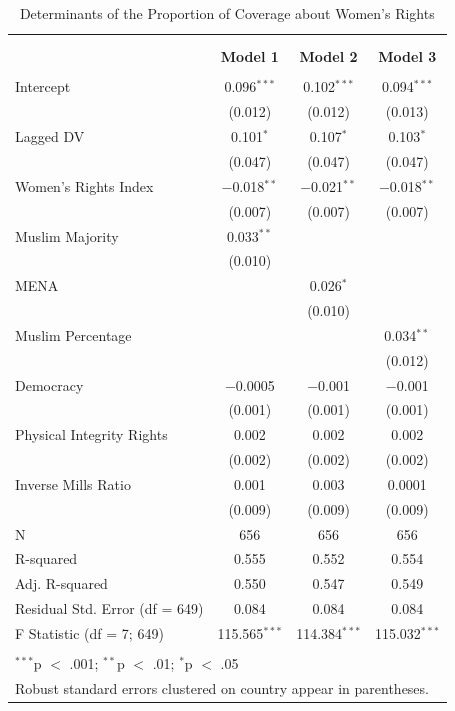 \documentclass[11pt, oneside]{article}
\begin{document}
\begin{table}[!htbp] \centering 
  \caption{Determinants of the Proportion of Coverage about Women's Rights} 
  \label{} 
\begin{tabular}{@{\extracolsep{5pt}}lccc} 
\\[-1.8ex]\hline \\[-1.8ex] 
\\[-1.8ex] & \textbf{Model 1} & \textbf{Model 2} & \textbf{Model 3}\\ 
\hline \\[-1.8ex] 
 Intercept & 0.096$^{***}$ & 0.102$^{***}$ & 0.094$^{***}$ \\ 
  & (0.012) & (0.012) & (0.013) \\ 
  Lagged DV & 0.101$^{*}$ & 0.107$^{*}$ & 0.103$^{*}$ \\ 
  & (0.047) & (0.047) & (0.047) \\ 
  Women's Rights Index & $-$0.018$^{**}$ & $-$0.021$^{**}$ & $-$0.018$^{**}$ \\ 
  & (0.007) & (0.007) & (0.007) \\ 
  Muslim Majority & 0.033$^{**}$ &  &  \\ 
  & (0.010) &  &  \\ 
  MENA &  & 0.026$^{*}$ &  \\ 
  &  & (0.010) &  \\ 
  Muslim Percentage &  &  & 0.034$^{**}$ \\ 
  &  &  & (0.012) \\ 
  Democracy & $-$0.0005 & $-$0.001 & $-$0.001 \\ 
  & (0.001) & (0.001) & (0.001) \\ 
  Physical Integrity Rights & 0.002 & 0.002 & 0.002 \\ 
  & (0.002) & (0.002) & (0.002) \\ 
  Inverse Mills Ratio & 0.001 & 0.003 & 0.0001 \\ 
  & (0.009) & (0.009) & (0.009) \\ 
 N & 656 & 656 & 656 \\ 
R-squared & 0.555 & 0.552 & 0.554 \\ 
Adj. R-squared & 0.550 & 0.547 & 0.549 \\ 
Residual Std. Error (df = 649) & 0.084 & 0.084 & 0.084 \\ 
F Statistic (df = 7; 649) & 115.565$^{***}$ & 114.384$^{***}$ & 115.032$^{***}$ \\ 
\hline \\[-1.8ex] 
\multicolumn{4}{l}{$^{***}$p $<$ .001; $^{**}$p $<$ .01; $^{*}$p $<$ .05} \\ 
\multicolumn{4}{l}{Robust standard errors clustered on country appear in parentheses.} \\ 
\end{tabular} 
\end{table} 
\end{document}

